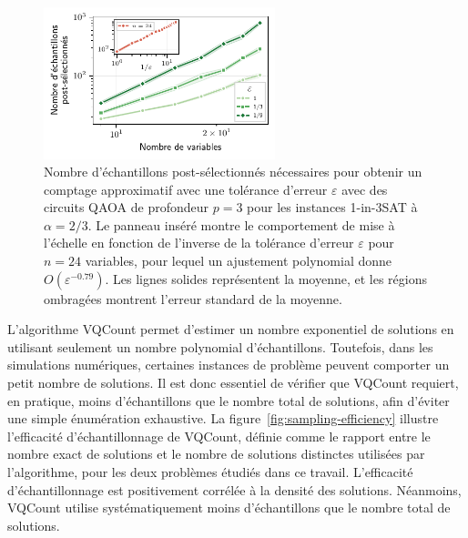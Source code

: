\begin{figure}[H]
    \centering
    \includegraphics[width=0.6\textwidth]{figures/1in3sat-scaling.pdf}
    \caption[Comportement d'échelle du nombre d'échantillons post-sélectionnés pour \#1-in-3SAT]{Nombre d'échantillons post-sélectionnés nécessaires pour obtenir un comptage approximatif avec une tolérance d'erreur $\varepsilon$ avec des circuits QAOA de profondeur $p=3$ pour les instances 1-in-3SAT à $\alpha=2/3$. Le panneau inséré montre le comportement de mise à l'échelle en fonction de l'inverse de la tolérance d'erreur $\varepsilon$ pour $n=24$ variables, pour lequel un ajustement polynomial donne $O(\varepsilon^{-0.79})$. Les lignes solides représentent la moyenne, et les régions ombragées montrent l'erreur standard de la moyenne.}
    \label{fig:1in3sat-scaling}
\end{figure}

L'algorithme VQCount permet d'estimer un nombre exponentiel de solutions en utilisant seulement un nombre polynomial d'échantillons. Toutefois, dans les simulations numériques, certaines instances de problème peuvent comporter un petit nombre de solutions. Il est donc essentiel de vérifier que VQCount requiert, en pratique, moins d'échantillons que le nombre total de solutions, afin d'éviter une simple énumération exhaustive. La figure~\ref{fig:sampling-efficiency} illustre l'efficacité d'échantillonnage de VQCount, définie comme le rapport entre le nombre exact de solutions et le nombre de solutions distinctes utilisées par l'algorithme, pour les deux problèmes étudiés dans ce travail. L'efficacité d'échantillonnage est positivement corrélée à la densité des solutions. Néanmoins, VQCount utilise systématiquement moins d'échantillons que le nombre total de solutions.

